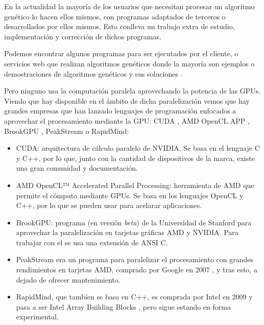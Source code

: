 En la actualidad la mayoría de los usuarios que necesitan procesar un algoritmo genético lo hacen ellos mismos, con programas adaptados de terceros o desarrollados por ellos mismos. Esto conlleva un trabajo extra de estudio, implementación y corrección de dichos programas. 

Podemos encontrar algunos programas \cite{agpython} \cite{agjava} \cite{agmatlab} para ser ejecutados por el cliente, o servicios web que realizan algoritmos genéticos donde la mayoría son ejemplos o demostraciones de algoritmos genéticos y sus soluciones \cite{agandar} \cite{agcoche}.


Pero ninguno usa la computación paralela aprovechando la potencia de las GPUs. Viendo que hay disponible en el ámbito de dicha paralelización vemos que hay grandes empresas que han lanzado lenguajes de programación enfocados a aprovechar el procesamiento mediante la GPU: CUDA \cite{nvidiacuda}, AMD OpenCL APP \cite{paralelizacionamd}, BrookGPU \cite{brookgpu}, PeakStream o RapidMind:

\begin{itemize}
	\item CUDA: arquitectura de cálculo paralelo de NVIDIA. Se basa en el lenguaje C y C++, por lo que, junto con la cantidad de dispositivos de la marca, existe una gran comunidad y documentación.
	
	\item AMD OpenCL™ Accelerated Parallel Processing: herramienta de AMD que permite el cómputo mediante GPUs. Se basa en los lenguajes OpenCL y C++, por lo que se pueden usar para acelarar aplicaciones.
	
	\item BrookGPU: programa (en versión \textit{beta}) de la Universidad de Stanford para aprovechar la paralelización en tarjetas gráficas AMD y NVIDIA. Para trabajar con el se usa una extensión de ANSI C.
	
	\item PeakStream era un programa para paralelizar el procesamiento con grandes rendimientos en tarjetas AMD, comprado por Google en 2007 \cite{peackstream}, y tras esto, a dejado de ofrecer mantenimiento.
	
	\item RapidMind, que tambíen se basa en C++, es comprada por Intel en 2009 y pasa a ser Intel Array Building Blocks \cite{rapidmind}, pero sigue estando en forma experimental. 
	
\end{itemize}

